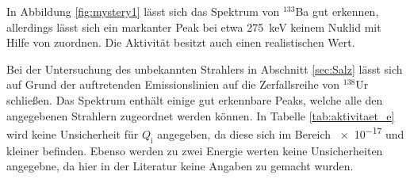 In Abbildung \ref{fig:mystery1} lässt sich das Spektrum von 
${}^{133}$Ba gut erkennen, allerdings lässt sich ein markanter 
Peak bei etwa \SI{275}{\kilo\electronvolt} keinem Nuklid 
mit Hilfe von \cite{referenz1} zuordnen. Die Aktivität besitzt auch
einen realistischen Wert.

Bei der Untersuchung des unbekannten Strahlers in Abschnitt \ref{sec:Salz}
lässt sich auf Grund der auftretenden Emissionslinien auf die Zerfallsreihe
von ${}^{138}$Ur schließen. Das Spektrum enthält einige gut erkennbare
Peaks, welche alle den angegebenen Strahlern zugeordnet werden können.
In Tabelle \ref{tab:aktivitaet_e} wird keine Unsicherheit für $Q_\text{i}$
angegeben, da diese sich im Bereich \num{e-17} und kleiner befinden.
Ebenso werden zu zwei Energie werten keine Unsicherheiten angegebne, da
hier in der Literatur keine Angaben zu gemacht wurden.